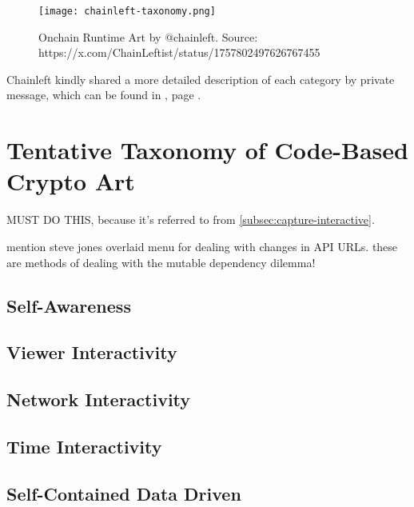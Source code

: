 \todo

\begin{figure}[h]
    \centering
    \captionsetup{justification=centering}
    \texttt{[image: chainleft-taxonomy.png]}
    \caption[Onchain Runtime Art]{Onchain Runtime Art by @chainleft. Source: https://x.com/ChainLeftist/status/1757802497626767455}
    \label{fig:onchainruntimeart}
\end{figure}


Chainleft kindly shared a more detailed description of each category by private message, which can be found in , page \pageref{appx:chainleft-taxonomy}.









\section{Tentative Taxonomy of Code-Based Crypto Art}
\label{sec:interactivity}

\todo MUST DO THIS, because it's referred to from \autoref{subsec:capture-interactive}.





\todo mention steve jones overlaid menu for dealing with changes in API URLs. these are methods of dealing with the mutable dependency dilemma!


\subsection{Self-Awareness}


\subsection{Viewer Interactivity}

\subsection{Network Interactivity}

\subsection{Time Interactivity}

\subsection{Self-Contained Data Driven}

